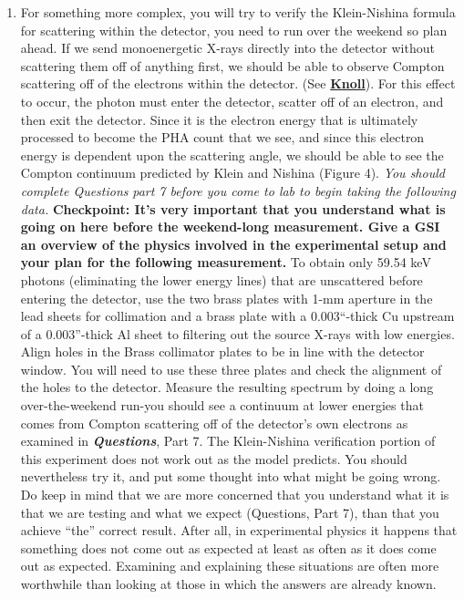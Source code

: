 \documentclass{../lab}
\begin{document}
\begin{enumerate}
    \item For something more complex, you will try to verify the Klein-Nishina formula for scattering within the detector, you need to run over the weekend so plan ahead. If we send monoenergetic X-rays directly into the detector without scattering them off of anything first, we should be able to observe Compton scattering off of the electrons within the detector. (See \href{http://physics111.lib.berkeley.edu/Physics111/Reprints/COM/COM\_index.html}{\textbf{Knoll}}). For this effect to occur, the photon must enter the detector, scatter off of an electron, and then exit the detector. Since it is the electron energy that is ultimately processed to become the PHA count that we see, and since this electron energy is dependent upon the scattering angle, we should be able to see the Compton continuum predicted by Klein and Nishina (Figure 4). \emph{You should complete Questions} \emph{part 7 before you come to lab to begin taking the following data.} \textbf{Checkpoint: It's very important that you understand what is going on here before the weekend-long measurement. Give a GSI an overview of the physics involved in the experimental setup and your plan for the following measurement.} To obtain only 59.54 keV photons (eliminating the lower energy lines) that are unscattered before entering the detector, use the two brass plates with 1-mm aperture in the lead sheets for collimation and a brass plate with a 0.003``-thick Cu upstream of a 0.003''-thick Al sheet to filtering out the source X-rays with low energies. Align holes in the Brass collimator plates to be in line with the detector window. You will need to use these three plates and check the alignment of the holes to the detector. Measure the resulting spectrum by doing a long over-the-weekend run-you should see a continuum at lower energies that comes from Compton scattering off of the detector's own electrons as examined in \emph{\textbf{Questions}}, Part 7. The Klein-Nishina verification portion of this experiment does not work out as the model predicts. You should nevertheless try it, and put some thought into what might be going wrong. Do keep in mind that we are more concerned that you understand what it is that we are testing and what we expect (Questions, Part 7), than that you achieve ``the'' correct result. After all, in experimental physics it happens that something does not come out as expected at least as often as it does come out as expected. Examining and explaining these situations are often more worthwhile than looking at those in which the answers are already known.


\end{enumerate}
\end{document}
